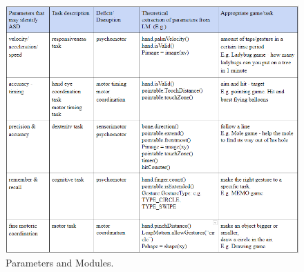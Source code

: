 


\begin{figure}[!ht]  %
  
  \includegraphics[width=1\textwidth]{figures/tableOfModules.png}
  \caption[Parameters and Modules.]{Parameters and Modules.}
  \label{fig:tableOfModules}
\end{figure}

